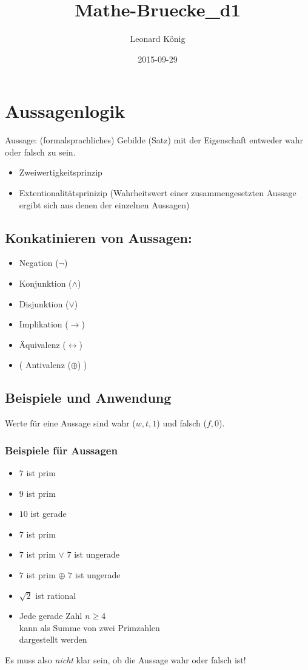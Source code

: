 \documentclass[10pt,a4paper]{article}
\author{Leonard König}
\title{Mathe-Bruecke_d1}
\date{2015-09-29}
\begin{document}
\section{Aussagenlogik}
Aussage: (formalsprachliches) Gebilde (Satz) mit der Eigenschaft entweder wahr oder falsch zu sein.
%
\begin{itemize}
\item Zweiwertigkeitsprinzip
\item Extentionalitätsprinizip (Wahrheitswert einer zusammengesetzten Aussage ergibt sich aus denen der einzelnen Aussagen)
\end{itemize}
%
\subsection{Konkatinieren von Aussagen:}
\begin{itemize}
\item Negation (\( \neg \)) 
\item Konjunktion (\( \land \)) 
\item Disjunktion (\( \lor \)) 
\item Implikation (\( \rightarrow \)) 
\item Äquivalenz (\( \leftrightarrow \)) 
\item ( Antivalenz (\( \oplus \)) ) 
\end{itemize}
%
\subsection{Beispiele und Anwendung}
%
Werte für eine Aussage sind wahr (\( w,t,1 \)) und falsch (\( f,0 \)).
%
\subsubsection{Beispiele für Aussagen}
\begin{itemize}
\item \glqq $7$ ist prim\grqq{}
\item \glqq $9$ ist prim\grqq{}
\item \glqq $10$ ist gerade\grqq{}
\item \glqq $7$ ist prim\grqq{}
\item \glqq $7$ ist prim $\lor$ $7$ ist ungerade\grqq{}
\item \glqq $7$ ist prim $\oplus$ $7$ ist ungerade\grqq{}
\item \glqq $\sqrt{2}$ ist rational\grqq{}
\item \glqq Jede gerade Zahl $n\geq 4$\\
kann als Summe von zwei Primzahlen\\
dargestellt werden\grqq{}
\end{itemize}
%
Es muss also \emph{nicht} klar sein, ob die Aussage wahr oder falsch ist!
%
\end{document}
